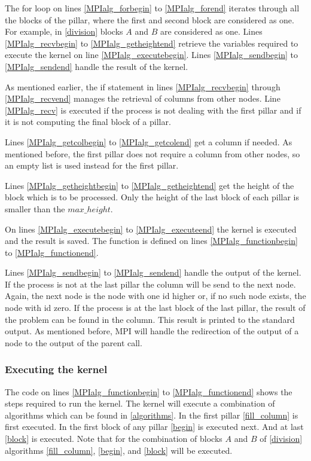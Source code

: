 The for loop on lines \ref{MPIalg_forbegin} to \ref{MPIalg_forend} iterates through all the blocks of the pillar, where the first and second block are considered as one.
For example, in \cref{division} blocks $A$ and $B$ are considered as one.
Lines \ref{MPIalg_recvbegin} to \ref{MPIalg_getheightend} retrieve the variables required to execute the kernel on line \ref{MPIalg_executebegin}.
Lines \ref{MPIalg_sendbegin} to \ref{MPIalg_sendend} handle the result of the kernel.

As mentioned earlier, the if statement in lines \ref{MPIalg_recvbegin} through \ref{MPIalg_recvend} manages the retrieval of columns from other nodes.
Line \ref{MPIalg_recv} is executed if the process is not dealing with the first pillar and if it is not computing the final block of a pillar.

Lines \ref{MPIalg_getcolbegin} to \ref{MPIalg_getcolend} get a column if needed.
As mentioned before, the first pillar does not require a column from other nodes, so an empty list is used instead for the first pillar.

Lines \ref{MPIalg_getheightbegin} to \ref{MPIalg_getheightend} get the height of the block which is to be processed.
Only the height of the last block of each pillar is smaller than the $max\_height$.

On lines \ref{MPIalg_executebegin} to \ref{MPIalg_executeend} the kernel is executed and the result is saved.
The function is defined on lines \ref{MPIalg_functionbegin} to \ref{MPIalg_functionend}.

Lines \ref{MPIalg_sendbegin} to \ref{MPIalg_sendend} handle the output of the kernel.
If the process is not at the last pillar the column will be send to the next node.
Again, the next node is the node with one id higher or, if no such node exists, the node with id zero.
If the process is at the last block of the last pillar, the result of the problem can be found in the column.
This result is printed to the standard output.
As mentioned before, MPI will handle the redirection of the output of a node to the output of the parent call.

\subsubsection{Executing the kernel}
The code on lines \ref{MPIalg_functionbegin} to \ref{MPIalg_functionend} shows the steps required to run the kernel.
The kernel will execute a combination of algorithms which can be found in \cref{algorithms}.
In the first pillar \cref{fill_column} is first executed.
In the first block of any pillar \cref{begin} is executed next.
And at last \cref{block} is executed.
Note that for the combination of blocks $A$ and $B$ of \cref{division} algorithms \ref{fill_column}, \ref{begin}, and \ref{block} will be executed.

